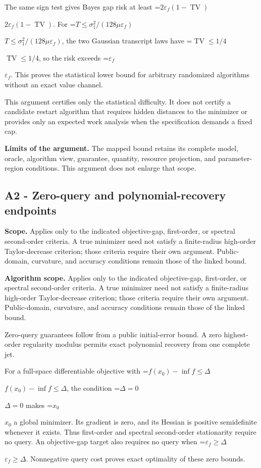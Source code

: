 \documentclass[10pt,a4paper]{article}
\newcommand{\AtlasMath}[1]{\par\begingroup\centering\setbox0=\hbox{$\displaystyle #1$}\ifdim\wd0>1.4\linewidth\typeout{ATLAS WIDE FORMULA: \the\wd0}\fi\ifdim\wd0>\linewidth\resizebox{\linewidth}{!}{\box0}\else\box0\fi\par\endgroup}
\newcommand{\AtlasInlineMath}[1]{\begingroup\setbox0=\hbox{$#1$}\ifdim\wd0>.4\linewidth\endgroup\AtlasMath{#1}\else\endgroup$#1$\fi}
\begin{document}
The same sign test gives Bayes gap risk at least \AtlasInlineMath{2\varepsilon_f(1-\operatorname{TV})}. For \AtlasInlineMath{T\le\sigma_1^2/(128\mu\varepsilon_f)}, the two Gaussian transcript laws have \AtlasInlineMath{\operatorname{TV}\le1/4}, so the risk exceeds \AtlasInlineMath{\varepsilon_f}. This proves the statistical lower bound for arbitrary randomized algorithms without an exact value channel.

This argument certifies only the statistical difficulty. It does not certify a candidate restart algorithm that requires hidden distances to the minimizer or provides only an expected work analysis when the specification demands a fixed cap.

\textbf{Limits of the argument.} The mapped bound retains its complete model, oracle, algorithm view, guarantee, quantity, resource projection, and parameter-region conditions. This argument does not enlarge that scope.

\subsection{A2 - Zero-query and polynomial-recovery endpoints}
\textbf{Scope.} Applies only to the indicated objective-gap, first-order, or spectral second-order criteria. A true minimizer need not satisfy a finite-radius high-order Taylor-decrease criterion; those criteria require their own argument. Public-domain, curvature, and accuracy conditions remain those of the linked bound.

\textbf{Algorithm scope.} Applies only to the indicated objective-gap, first-order, or spectral second-order criteria. A true minimizer need not satisfy a finite-radius high-order Taylor-decrease criterion; those criteria require their own argument. Public-domain, curvature, and accuracy conditions remain those of the linked bound.

Zero-query guarantees follow from a public initial-error bound. A zero highest-order regularity modulus permits exact polynomial recovery from one complete jet.

For a full-space differentiable objective with \AtlasInlineMath{f(x_0)-\inf f\le\Delta}, the condition \AtlasInlineMath{\Delta=0} makes \AtlasInlineMath{x_0} a global minimizer. Its gradient is zero, and its Hessian is positive semidefinite whenever it exists. Thus first-order and spectral second-order stationarity require no query. An objective-gap target also requires no query when \AtlasInlineMath{\varepsilon_f\ge\Delta}. Nonnegative query cost proves exact optimality of these zero bounds.
\end{document}
